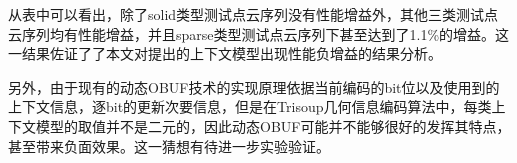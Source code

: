 \documentclass[bachelor,print,msfonts]{xduthesis}
\begin{document}
{
\scriptsize
\begin{table}[h]
    \fontsize{10.5pt}{15pt}\selectfont
    \centering
    \caption{\label{额外实验性能表} 额外实验性能表}
\end{table}
}

从表中可以看出，除了solid类型测试点云序列没有性能增益外，其他三类测试点云序列均有性能增益，并且sparse类型测试点云序列下甚至达到了1.1\%的增益。这一结果佐证了了本文对提出的上下文模型出现性能负增益的结果分析。

另外，由于现有的动态OBUF技术的实现原理依据当前编码的bit位以及使用到的上下文信息，逐bit的更新次要信息，但是在Trisoup几何信息编码算法中，每类上下文模型的取值并不是二元的，因此动态OBUF可能并不能够很好的发挥其特点，甚至带来负面效果。这一猜想有待进一步实验验证。

\ifx\allfiles\undefined
\end{document}
